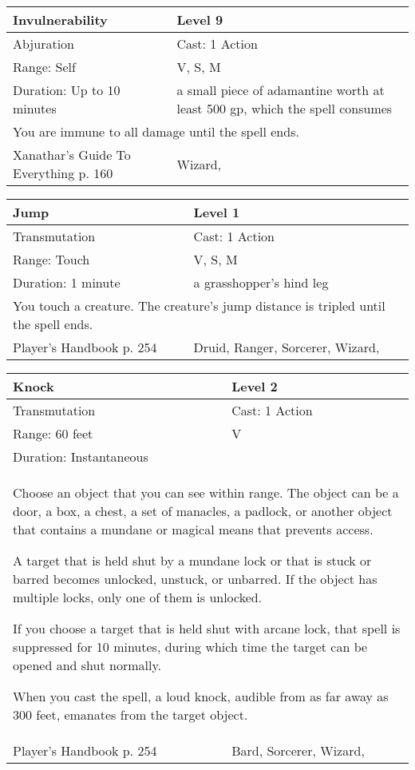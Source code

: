 \documentclass[11pt]{report}
\begin{document}
\begin{table}[H]
	\begin{tabular}{||p{6cm}|p{6cm}||}
		\hline\hline
		\bf{Invulnerability} & Level 9\\ \hline
		Abjuration & Cast: 1 Action\\ \hline
		Range: Self & V, S, M\\ \hline
		Duration: Up to 10 minutes & a small piece of adamantine worth at least 500 gp, which the spell consumes\\ \hline
		\multicolumn{2}{||p{12cm}||}{You are immune to all damage until the spell ends.}\\ \hline
Xanathar's Guide To Everything p. 160 & Wizard, \\ \hline\hline
	\end{tabular}
\end{table}

\begin{table}[H]
	\begin{tabular}{||p{6cm}|p{6cm}||}
		\hline\hline
		\bf{Jump} & Level 1\\ \hline
		Transmutation & Cast: 1 Action\\ \hline
		Range: Touch & V, S, M\\ \hline
		Duration: 1 minute & a grasshopper’s hind leg\\ \hline
		\multicolumn{2}{||p{12cm}||}{You touch a creature. The creature’s jump distance is tripled until the spell ends.}\\ \hline
Player's Handbook p. 254 & Druid, Ranger, Sorcerer, Wizard, \\ \hline\hline
	\end{tabular}
\end{table}

\begin{table}[H]
	\begin{tabular}{||p{6cm}|p{6cm}||}
		\hline\hline
		\bf{Knock} & Level 2\\ \hline
		Transmutation & Cast: 1 Action\\ \hline
		Range: 60 feet & V\\ \hline
		Duration: Instantaneous & \\ \hline
		\multicolumn{2}{||p{12cm}||}{Choose an object that you can see within range. The object can be a door, a box, a chest, a set of manacles, a padlock, or another object that contains a mundane or magical means that prevents access.

A target that is held shut by a mundane lock or that is stuck or barred becomes unlocked, unstuck, or unbarred. If the object has multiple locks, only one of them is unlocked.

If you choose a target that is held shut with arcane lock, that spell is suppressed for 10 minutes, during which time the target can be opened and shut normally.

When you cast the spell, a loud knock, audible from as far away as 300 feet, emanates from the target object.}\\ \hline
Player's Handbook p. 254 & Bard, Sorcerer, Wizard, \\ \hline\hline
	\end{tabular}
\end{table}
\end{document}
